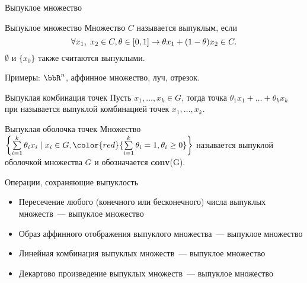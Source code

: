 \documentclass[12pt,russian]{beamer}
\begin{document}
\begin{frame}{Выпуклое множество}
\small
\begin{block}{Выпуклое множество}
Множество $C$ называется выпуклым, если 
\vspace{-4mm}
\[
\forall x_1, \; x_2 \in C, \theta \in [0, 1] \rightarrow \theta x_1 + (1 - \theta)x_2 \in C.
\vspace{-4mm}
\]
$\emptyset$ и $\{ x_0 \}$ также считаются выпуклыми.
\end{block}
Примеры: $\bbR^n$, аффинное множество, луч, отрезок.
\begin{block}{Выпуклая комбинация точек}
Пусть $x_1, \ldots, x_k \in G$, тогда точка $\theta_1 x_1 + \ldots + \theta_k x_k$ при {} называется выпуклой комбинацией точек $x_1,\ldots,x_k$.
\end{block}

\begin{block}{Выпуклая оболочка точек}
Множество $\left\{ \sum\limits_{i=1}^k \theta_i x_i \; | \; x_i \in G, {\color{red}{\sum\limits_{i=1}^k \theta_i = 1, \theta_i \geq 0}} \right\}$ называется выпуклой оболочкой множества $G$ и обозначается \textbf{conv}(G).
\end{block}

\end{frame}

\begin{frame}{Операции, сохраняющие выпуклость}
\begin{itemize}
\item Пересечение любого (конечного или бесконечного) числа выпуклых множеств~--- выпуклое множество
\item Образ аффинного отображения выпуклого множества~--- выпуклое множество
\item Линейная комбинация выпуклых множеств~--- выпуклое множество
\item Декартово произведение выпуклых множеств~--- выпуклое множество
\end{itemize}
\end{frame}
\end{document}
